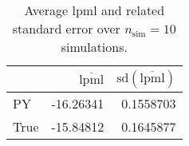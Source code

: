 \begin{table}[H]

\caption{Average lpml and related standard error over $n_{\text{sim}} = 10$ simulations.}
\centering
\begin{tabular}[t]{lrr}
\toprule
  & $\overbar{\text{lpml}}$ & $\text{sd}(\overbar{\text{lpml}})$\\
\midrule
PY & -16.26341 & 0.1558703\\
True & -15.84812 & 0.1645877\\
\bottomrule
\end{tabular}
\end{table}